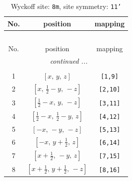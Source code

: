 \documentclass[fleqn,8pt]{jsarticle}
\begin{document}
\renewcommand{\arraystretch}{1.2}
\begin{longtable}{ccc}
\caption{Wyckoff site: {\tt 8m}, site symmetry: {\tt 11'}}
 \\
 \hline \hline
No. & position & mapping \\ \hline \endfirsthead

\multicolumn{2}{l}{\tablename\ \thetable{}} \\
 \hline \hline
No. & position & mapping \\ \hline \endhead

 \hline \hline
\multicolumn{2}{r}{\footnotesize\it continued ...} \\ \endfoot

 \hline \hline
\multicolumn{2}{r}{} \\ \endlastfoot

1 & $\left[ x,\, y,\, z \right]$ & {\tt [1,9]} \\ \hline
2 & $\left[ x,\, \frac{1}{2} - y,\, - z \right]$ & {\tt [2,10]} \\ \hline
3 & $\left[ \frac{1}{2} - x,\, y,\, - z \right]$ & {\tt [3,11]} \\ \hline
4 & $\left[ \frac{1}{2} - x,\, \frac{1}{2} - y,\, z \right]$ & {\tt [4,12]} \\ \hline
5 & $\left[ - x,\, - y,\, - z \right]$ & {\tt [5,13]} \\ \hline
6 & $\left[ - x,\, y + \frac{1}{2},\, z \right]$ & {\tt [6,14]} \\ \hline
7 & $\left[ x + \frac{1}{2},\, - y,\, z \right]$ & {\tt [7,15]} \\ \hline
8 & $\left[ x + \frac{1}{2},\, y + \frac{1}{2},\, - z \right]$ & {\tt [8,16]} \\
\end{longtable}
\end{document}
